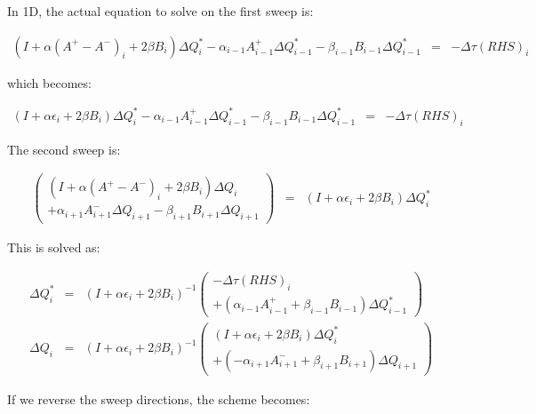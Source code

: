In 1D, the actual equation to solve on the first
sweep is:

\begin{eqnarray}
\left(
I 
+ \alpha \left(A^+ - A^- \right)_i 
+ 2 \beta B_i 
\right)
\Delta Q^*_i 
-\alpha_{i-1} A^+_{i-1} \Delta Q^*_{i-1}
-\beta_{i-1} B_{i-1}\Delta Q^*_{i-1}
&=& -\Delta \tau \left(RHS \right)_i
\nonumber
\end{eqnarray}

which becomes:

\begin{eqnarray}
\left(
I 
+ \alpha \epsilon_i
+ 2 \beta B_i 
\right)
\Delta Q^*_i 
-\alpha_{i-1} A^+_{i-1} \Delta Q^*_{i-1}
-\beta_{i-1} B_{i-1}\Delta Q^*_{i-1}
&=& -\Delta \tau \left(RHS \right)_i
\nonumber
\end{eqnarray}

The second sweep is:

\begin{eqnarray}
\left(
\begin{array}{c}
\left(
I 
+ \alpha \left(A^+ - A^- \right)_i 
+ 2 \beta B_i 
\right)
\Delta Q_i 
\\
+\alpha_{i+1} A^-_{i+1} \Delta Q_{i+1}
-\beta_{i+1} B_{i+1}\Delta Q_{i+1}
\end{array}
\right)
&=& 
\left(
I 
+ \alpha \epsilon_i
+ 2 \beta B_i 
\right)
\Delta Q^*_i 
\nonumber
\end{eqnarray}

This is solved as:

\begin{eqnarray}
\Delta Q^*_i 
&=&
\left(
I 
+ \alpha \epsilon_i
+ 2 \beta B_i 
\right)^{-1}
\left(
\begin{array}{c}
-\Delta \tau \left(RHS \right)_i
\\
+\left(\alpha_{i-1} A^+_{i-1} 
+\beta_{i-1} B_{i-1} \right)
\Delta Q^*_{i-1}
\end{array}
\right)
\nonumber
\\
\Delta Q_i 
&=&
\left(
I 
+ \alpha \epsilon_i
+ 2 \beta B_i 
\right)^{-1}
\left(
\begin{array}{c}
\left(
I 
+ \alpha \epsilon_i
+ 2 \beta B_i 
\right)
\Delta Q^*_{i}
\\
+\left(-\alpha_{i+1} A^-_{i+1} 
+\beta_{i+1} B_{i+1} \right)
\Delta Q_{i+1}
\end{array}
\right)
\nonumber
\end{eqnarray}

If we reverse the sweep directions, the scheme becomes:


